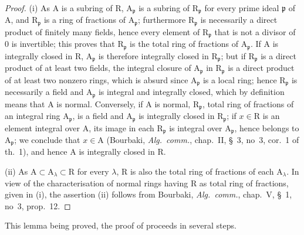 \begin{proof}
(i) As $\mathrm{A}$ is a subring of $\mathrm{R}$, $\mathrm{A}_\mathfrak{p}$ is a subring of $\mathrm{R}_\mathfrak{p}$ for every
prime ideal $\mathfrak{p}$ of $\mathrm{A}$, and $\mathrm{R}_\mathfrak{p}$ is a ring of fractions of $\mathrm{A}_\mathfrak{p}$; furthermore $\mathrm{R}_\mathfrak{p}$ is necessarily
a direct product of finitely many fields, hence every element of $\mathrm{R}_\mathfrak{p}$ that is not a
divisor of $0$ is invertible; this proves that $\mathrm{R}_\mathfrak{p}$ is the total ring of fractions of $\mathrm{A}_\mathfrak{p}$.
If $\mathrm{A}$ is integrally closed in $\mathrm{R}$, $\mathrm{A}_\mathfrak{p}$ is therefore integrally closed in $\mathrm{R}_\mathfrak{p}$; but
if $\mathrm{R}_\mathfrak{p}$ is a direct product of at least two fields, the integral closure of $\mathrm{A}_\mathfrak{p}$ in $\mathrm{R}_\mathfrak{p}$ is
a direct product of at least two nonzero rings, which is absurd since $\mathrm{A}_\mathfrak{p}$
is a local ring; hence $\mathrm{R}_\mathfrak{p}$ is necessarily a field and $\mathrm{A}_\mathfrak{p}$ is integral and integrally
closed, which by definition means that $\mathrm{A}$ is normal. Conversely, if $\mathrm{A}$ is normal,
$\mathrm{R}_\mathfrak{p}$, total ring of fractions of an integral ring $\mathrm{A}_\mathfrak{p}$, is a field and $\mathrm{A}_\mathfrak{p}$ is integrally
closed in $\mathrm{R}_\mathfrak{p}$; if $x\in\mathrm{R}$ is an element integral over $\mathrm{A}$, its image in each $\mathrm{R}_\mathfrak{p}$ is
integral over $\mathrm{A}_\mathfrak{p}$, hence belongs to $\mathrm{A}_\mathfrak{p}$; we conclude that $x\in\mathrm{A}$ (Bourbaki, \emph{Alg.~comm.},
chap.~II, \S~3, no~3, cor.~1 of th.~1), and hence $\mathrm{A}$ is integrally closed in $\mathrm{R}$.


(ii) As $\mathrm{A}\subset\mathrm{A}_\lambda\subset\mathrm{R}$ for every $\lambda$, $\mathrm{R}$ is also the total ring of fractions of each $\mathrm{A}_\lambda$.
In view of the characterisation of normal rings having $\mathrm{R}$ as total ring of fractions, given in (i),
the assertion (ii) follows from Bourbaki, \emph{Alg.~comm.}, chap.~V,
\S~1, no~3, prop.~12.
\end{proof}

This lemma being proved, the proof of  proceeds in several steps.

